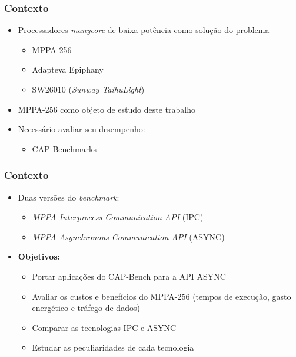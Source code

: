 \documentclass[xcolor={table}]{beamer}
\begin{document}
\begin{frame}\frametitle{Contexto}
    \begin{itemize}
        \item{Processadores \textit{manycore} de baixa potência como solução do problema}
        \begin{itemize}
            \item {MPPA-256 \cite{MPPA-2:2013}}
            \item {Adapteva Epiphany \cite{Olofsson2014}}
            \item {SW26010 (\textit{Sunway TaihuLight}) \cite{sunway:2016}}
        \end{itemize}
        \item MPPA-256 como objeto de estudo deste trabalho
        \item {Necessário avaliar seu desempenho:}
        \begin{itemize}
            \item CAP-Benchmarks
        \end{itemize}
    \end{itemize}

    \vfill
\end{frame}

\begin{frame}\frametitle{Contexto}
    \begin{itemize}
        \item {Duas versões do \textit{benchmark}:}
        \begin{itemize}
            \item \textit{MPPA Interprocess Communication API} (IPC)
            \item \textit{MPPA Asynchronous Communication API} (ASYNC)
        \end{itemize}
        \item {\textbf{Objetivos:}}
        \begin{itemize}
            \item Portar aplicações do CAP-Bench para a API ASYNC
            \item Avaliar os custos e benefícios do MPPA-256 (tempos de execução, gasto energético e tráfego de dados)
            \item Comparar as tecnologias IPC e ASYNC
            \item Estudar as peculiaridades de cada tecnologia
        \end{itemize}
    \end{itemize}
    \vfill
\end{frame}
\end{document}
